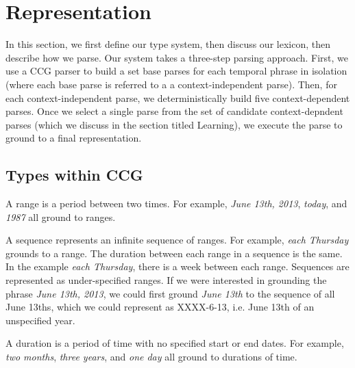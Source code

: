 \section{Representation}
\label{sec:representation}

In this section, we first define our type system, then discuss our lexicon, then describe how we parse. Our system takes a three-step parsing approach. First, we use a CCG parser to build a set base parses for each temporal phrase in isolation (where each base parse is referred to a a context-independent parse). Then, for each context-independent parse, we deterministically build five context-dependent parses. Once we select a single parse from the set of candidate context-depndent parses (which we discuss in the section titled Learning), we execute the parse to ground to a final representation.

\subsection{Types within CCG}
\label{sec:CCGtypes}
\begin{definition}[Range]
A range is a period between two times. For example, \emph{June 13th, 2013}, \emph{today}, and \emph{1987} all ground to ranges.
\end{definition}

\begin{definition}[Sequence] 
A sequence represents an infinite sequence of ranges. For example, \emph{each Thursday} grounds to a range. The duration between each range in a sequence is the same. In the example \emph{each Thursday}, there is a week between each range. Sequences are represented as under-specified ranges. If we were interested in grounding the phrase \emph{June 13th, 2013}, we could first ground \emph{June 13th} to the sequence of all June 13ths, which we could represent as XXXX-6-13, i.e. June 13th of an unspecified year.
\end{definition}

\begin{definition}[Duration]
A duration is a period of time with no specified start or end dates. For example, \emph{two months}, \emph{three years}, and \emph{one day} all ground to durations of time. 
\end{definition}

